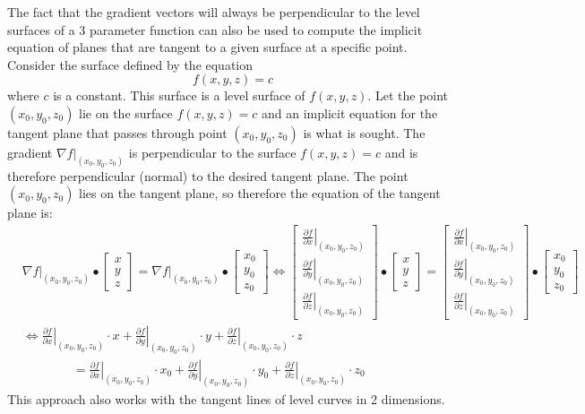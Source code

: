 \documentclass{article}
\begin{document}
The fact that the gradient vectors will always be perpendicular to the level surfaces of a 3 parameter function can also be used to compute the implicit equation of planes that are tangent to a given surface at a specific point. Consider the surface defined by the equation 
\[f(x,y,z) = c\]
where \(c\) is a constant. This surface is a level surface of \(f(x,y,z)\). Let the point \((x_0, y_0, z_0)\) lie on the surface \(f(x,y,z) = c\) and an implicit equation for the tangent plane that passes through point \((x_0, y_0, z_0)\) is what is sought. The gradient \(\nabla f\Big|_{(x_0, y_0, z_0)}\) is perpendicular to the surface \(f(x,y,z) = c\) and is therefore perpendicular (normal) to the desired tangent plane. The point \((x_0, y_0, z_0)\) lies on the tangent plane, so therefore the equation of the tangent plane is:
\begin{align*}
& \nabla f\Big|_{(x_0, y_0, z_0)} \bullet \begin{bmatrix} x \\ y \\ z \end{bmatrix} = \nabla f\Big|_{(x_0, y_0, z_0)} \bullet \begin{bmatrix} x_0 \\ y_0 \\ z_0 \end{bmatrix}  
\iff \begin{bmatrix} \left.\frac{\partial f}{\partial x}\right|_{(x_0, y_0, z_0)} \\ \left.\frac{\partial f}{\partial y}\right|_{(x_0, y_0, z_0)} \\ \left.\frac{\partial f}{\partial z}\right|_{(x_0, y_0, z_0)} \end{bmatrix} \bullet \begin{bmatrix} x \\ y \\ z \end{bmatrix} = \begin{bmatrix} \left.\frac{\partial f}{\partial x}\right|_{(x_0, y_0, z_0)} \\ \left.\frac{\partial f}{\partial y}\right|_{(x_0, y_0, z_0)} \\ \left.\frac{\partial f}{\partial z}\right|_{(x_0, y_0, z_0)} \end{bmatrix} \bullet \begin{bmatrix} x_0 \\ y_0 \\ z_0 \end{bmatrix} \\ 
& \iff \left.\frac{\partial f}{\partial x}\right|_{(x_0, y_0, z_0)} \cdot x + \left.\frac{\partial f}{\partial y}\right|_{(x_0, y_0, z_0)} \cdot y + \left.\frac{\partial f}{\partial z}\right|_{(x_0, y_0, z_0)} \cdot z \\
& \quad\quad\quad\quad = \left.\frac{\partial f}{\partial x}\right|_{(x_0, y_0, z_0)} \cdot x_0 + \left.\frac{\partial f}{\partial y}\right|_{(x_0, y_0, z_0)} \cdot y_0 + \left.\frac{\partial f}{\partial z}\right|_{(x_0, y_0, z_0)} \cdot z_0 
\end{align*}
This approach also works with the tangent lines of level curves in 2 dimensions.
\end{document}
